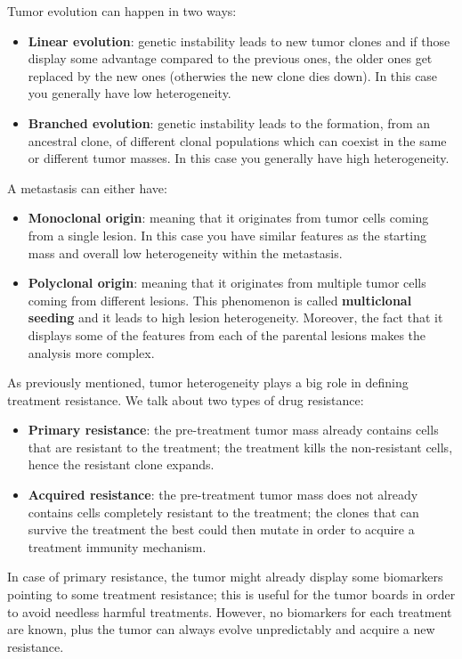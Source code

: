   Tumor evolution can happen in two ways:
  \begin{itemize}
    \item \textbf{Linear evolution}: genetic instability leads to new tumor clones and if those display some advantage compared to the previous ones, the older ones get replaced by the new ones (otherwies the new clone dies down). In this case you generally have low heterogeneity. 
    \item \textbf{Branched evolution}: genetic instability leads to the formation, from an ancestral clone, of different clonal populations which can coexist in the same or different tumor masses. In this case you generally have high heterogeneity.
  \end{itemize}
  
  A metastasis can either have:
  \begin{itemize}
    \item \textbf{Monoclonal origin}: meaning that it originates from tumor cells coming from a single lesion. In this case you have similar features as the starting mass and overall low heterogeneity within the metastasis.
    \item \textbf{Polyclonal origin}: meaning that it originates from multiple tumor cells coming from different lesions. This phenomenon is called \textbf{multiclonal seeding} and it leads to high lesion heterogeneity. Moreover, the fact that it displays some of the features from each of the parental lesions makes the analysis more complex.
  \end{itemize}
  
  As previously mentioned, tumor heterogeneity plays a big role in defining treatment resistance.
  We talk about two types of drug resistance:
  \begin{itemize}
    \item \textbf{Primary resistance}: the pre-treatment tumor mass already contains cells that are resistant to the treatment; the treatment kills the non-resistant cells, hence the resistant clone expands. 
    \item \textbf{Acquired resistance}: the pre-treatment tumor mass does not already contains cells completely resistant to the treatment; the clones that can survive the treatment the best could then mutate in order to acquire a treatment immunity mechanism. 
  \end{itemize}
  In case of primary resistance, the tumor might already display some biomarkers pointing to some treatment resistance; this is useful for the tumor boards in order to avoid needless harmful treatments. However, no biomarkers for each treatment are known, plus the tumor can always evolve unpredictably and acquire a new resistance. 


